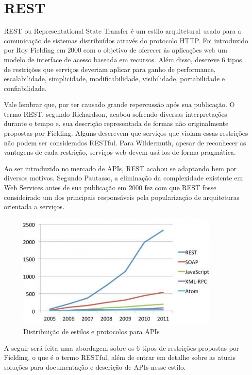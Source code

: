 \section{REST}

REST ou Representational State Transfer é um estilo arquitetural usado para a comunicação de sistemas distribuídos através do protocolo HTTP. Foi introduzido por Roy Fielding em 2000 com o objetivo de oferecer às aplicações web um modelo de interface de acesso baseada em recursos. Além disso, descreve 6 tipos de restrições que serviços deveriam aplicar para ganho de performance, escalabilidade, simplicidade, modificabilidade, visibilidade, portabilidade e confiabilidade.

Vale lembrar que, por ter causado grande repercussão após sua publicação. O termo REST, segundo Richardson, acabou sofrendo diversas interpretações durante o tempo e, sua descrição representada de formas não originalmente propostas por Fielding. Alguns descrevem que serviços que violam essas restrições não podem ser considerados RESTful. Para Wildermuth, apesar de reconhecer as vantagens de cada restrição, serviços web devem usá-los de forma pragmática. \cite{RichardsonEtAl2013} \cite{Wildermuth2015}

Ao ser introduzido no mercado de APIs, REST acabou se adaptando bem por diversos motivos. Segundo Pautasso, a eliminação da complexidade existente em Web Services antes de sua publicação em 2000 fez com que REST fosse consideirado um dos principais responsáveis pela popularização de arquiteturas orientada a serviços. \cite{PautassoEtAl2008}

\begin{figure}[H]
  \centering    \includegraphics[width=0.9\textwidth,height=\textheight,keepaspectratio]{figuras/api-styles.jpg}
  \caption{Distribuição de estilos e protocolos para APIs}
\end{figure}

A seguir será feita uma abordagem sobre os 6 tipos de restrições propostas por Fielding, o que é o termo RESTful, além de entrar em detalhe sobre as atuais soluções para documentação e descrição de APIs nesse estilo.




